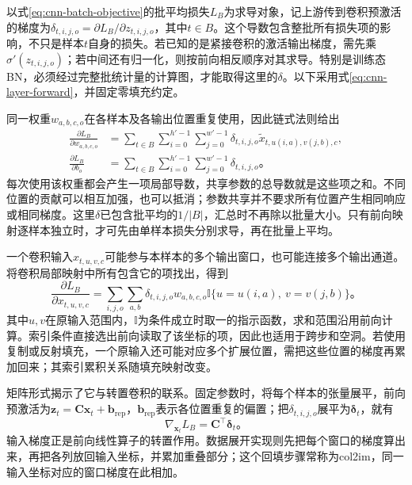 以式\eqref{eq:cnn-batch-objective}的批平均损失$L_B$为求导对象，记上游传到卷积预激活的梯度为$\delta_{t,i,j,o}=\partial L_B/\partial z_{t,i,j,o}$，其中$t\in B$。这个导数包含整批所有损失项的影响，不只是样本$t$自身的损失。若已知的是紧接卷积的激活输出梯度，需先乘$\sigma'(z_{t,i,j,o})$；若中间还有归一化，则按前向相反顺序对其求导。特别是训练态BN，必须经过完整批统计量的计算图，才能取得这里的$\delta$。以下采用式\eqref{eq:cnn-layer-forward}，并固定零填充约定。

同一权重$w_{a,b,c,o}$在各样本及各输出位置重复使用，因此链式法则给出
\begin{equation}
  \begin{aligned}
    \frac{\partial L_B}{\partial w_{a,b,c,o}}
      &=\sum_{t\in B}\sum_{i=0}^{h'-1}\sum_{j=0}^{w'-1}
         \delta_{t,i,j,o}\widetilde x_{t,u(i,a),v(j,b),c},\\
    \frac{\partial L_B}{\partial b_o}
      &=\sum_{t\in B}\sum_{i=0}^{h'-1}\sum_{j=0}^{w'-1}
         \delta_{t,i,j,o}\text{。}
  \end{aligned}
  \label{eq:cnn-parameter-gradients}
\end{equation}
每次使用该权重都会产生一项局部导数，共享参数的总导数就是这些项之和。不同位置的贡献可以相互加强，也可以抵消；参数共享并不要求所有位置产生相同响应或相同梯度。这里$\delta$已包含批平均的$1/|B|$，汇总时不再除以批量大小。只有前向映射逐样本独立时，才可先由单样本损失分别求导，再在批量上平均。

一个卷积输入$x_{t,u,v,c}$可能参与本样本的多个输出窗口，也可能连接多个输出通道。将卷积局部映射中所有包含它的项找出，得到
\begin{equation}
  \frac{\partial L_B}{\partial x_{t,u,v,c}}
  =\sum_{i,j,o}\sum_{a,b}
    \delta_{t,i,j,o}w_{a,b,c,o}
    \mathbb I\{u=u(i,a),\ v=v(j,b)\}\text{。}
  \label{eq:cnn-input-gradient}
\end{equation}
其中$u,v$在原输入范围内，$\mathbb I$为条件成立时取一的指示函数，求和范围沿用前向计算。索引条件直接选出前向读取了该坐标的项，因此也适用于跨步和空洞。若使用复制或反射填充，一个原输入还可能对应多个扩展位置，需把这些位置的梯度再累加回来；其索引累积关系随填充映射改变。

矩阵形式揭示了它与转置卷积的联系。固定参数时，将每个样本的张量展平，前向预激活为$\bm z_t=\bm C\bm x_t+\bm b_{\mathrm{rep}}$，$\bm b_{\mathrm{rep}}$表示各位置重复的偏置；把$\delta_{t,i,j,o}$展平为$\bm\delta_t$，就有
\begin{equation}
  \nabla_{\bm x_t}L_B=\bm C^\top\bm\delta_t\text{。}
  \label{eq:cnn-backprop-transpose}
\end{equation}
输入梯度正是前向线性算子的转置作用。数据展开实现则先把每个窗口的梯度算出来，再把各列放回输入坐标，并累加重叠部分；这个回填步骤常称为col2im，同一输入坐标对应的窗口梯度在此相加。

